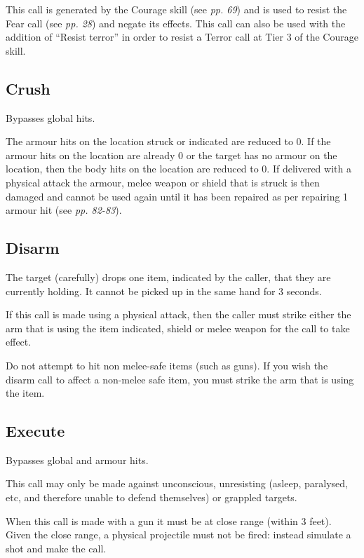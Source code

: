This call is generated by the Courage skill (see \textit{pp. 69}) and is used to resist the Fear call (see \textit{pp. 28}) and negate its effects. This call can also be used with the addition of ``Resist terror'' in order to resist a Terror call at Tier 3 of the Courage skill.

\subsection{Crush}

Bypasses global hits.

The armour hits on the location struck or indicated are reduced to 0. If the armour hits on the location are already 0 or the target has no armour on the location, then the body hits on the location are reduced to 0. If delivered with a physical attack the armour, melee weapon or shield that is struck is then damaged and cannot be used again until it has been repaired as per repairing 1 armour hit (see \textit{pp. 82-83}).

\subsection{Disarm}

The target (carefully) drops one item, indicated by the caller, that they are currently holding. It cannot be picked up in the same hand for 3 seconds.

If this call is made using a physical attack, then the caller must strike either the arm that is using the item indicated, shield or melee weapon for the call to take effect.

Do not attempt to hit non melee-safe items (such as guns). If you wish the disarm call to affect a non-melee safe item, you must strike the arm that is using the item.

\subsection{Execute}

Bypasses global and armour hits.

This call may only be made against unconscious, unresisting (asleep, paralysed, etc, and therefore unable to defend themselves) or grappled targets.

When this call is made with a gun it must be at close range (within 3 feet). Given the close range, a physical projectile must not be fired: instead simulate a shot and make the call.

